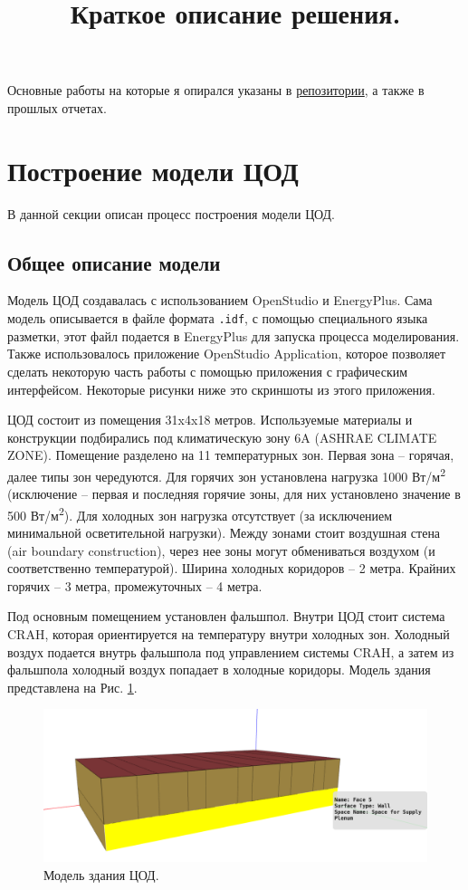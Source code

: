 \documentclass{article}
\title{Краткое описание решения.}
\date{}
\begin{document}
\maketitle

Основные работы на которые я опирался указаны в \href{https://github.com/koshachya-myata/RL_DataCener_Literature}{репозитории}, а также в прошлых отчетах.


\section{Построение модели ЦОД}
В данной секции описан процесс построения модели ЦОД.

\subsection{Общее описание модели}
Модель ЦОД создавалась с использованием OpenStudio и EnergyPlus. Сама модель описывается в файле формата \Verb+.idf+, с помощью специального языка разметки, этот файл подается в EnergyPlus для запуска процесса моделирования. Также использовалось приложение OpenStudio Application, которое позволяет сделать некоторую часть работы с помощью приложения с графическим интерфейсом. Некоторые рисунки ниже это скриншоты из этого приложения.

ЦОД состоит из помещения 31x4x18 метров. Используемые материалы и конструкции подбирались под климатическую зону 6A (ASHRAE CLIMATE ZONE). Помещение разделено на 11 температурных зон. Первая зона – горячая, далее типы зон чередуются. Для горячих зон установлена нагрузка 1000 Вт/м\textsuperscript{2} (исключение -- первая и последняя горячие зоны, для них установлено значение в 500 Вт/м\textsuperscript{2}). Для холодных зон нагрузка отсутствует (за исключением минимальной осветительной нагрузки). Между зонами стоит воздушная стена (air boundary construction), через нее зоны могут обмениваться воздухом (и соответственно температурой). Ширина холодных коридоров – 2 метра. Крайних горячих – 3 метра, промежуточных – 4 метра.

Под основным помещением установлен фальшпол. Внутри ЦОД стоит система CRAH, которая ориентируется на температуру внутри холодных зон. Холодный воздух подается внутрь фальшпола под управлением системы CRAH, а затем из фальшпола холодный воздух попадает в холодные коридоры.
Модель здания представлена на Рис. \ref{fig:DC_model}.

\begin{figure}[h!]
\centering
\includegraphics[width=0.8\linewidth]{figures/DC_model.png}
\caption{Модель здания ЦОД.}
\label{fig:DC_model}
\end{figure}
\end{document}
